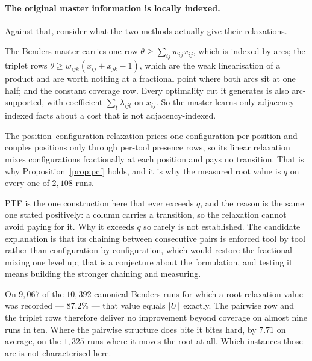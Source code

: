 \paragraph{The original master information is locally indexed.}
Against that, consider what the two methods actually give their relaxations.

The Benders master carries one row $\theta\ge\sum_{ij}w_{ij}x_{ij}$, which is indexed
by arcs; the triplet rows $\theta\ge w_{ijk}(x_{ij}+x_{jk}-1)$, which are the weak
linearisation of a product and are worth nothing at a fractional point where both arcs
sit at one half; and the constant coverage row. Every optimality cut it generates is
also arc-supported, with coefficient $\sum_t\lambda_{ijt}$ on $x_{ij}$. So the master
learns only adjacency-indexed facts about a cost that is not adjacency-indexed.

The position--configuration relaxation prices one configuration per position and
couples positions only through per-tool presence rows, so its linear relaxation mixes
configurations fractionally at each position and pays no transition. That is why
Proposition~\ref{prop:pcf} holds, and it is why the measured root value is $q$ on every
one of $2{,}108$ runs.

PTF is the one construction here that ever exceeds $q$, and the reason is the same one
stated positively: a column carries a transition, so the relaxation cannot avoid paying
for it. Why it exceeds $q$ so rarely is not established. The candidate explanation is
that its chaining between consecutive pairs is enforced tool by tool rather than
configuration by configuration, which would restore the fractional mixing one level up;
that is a conjecture about the formulation, and testing it means building the stronger
chaining and measuring.

\begin{observation}\label{obs:rootq}
On $9{,}067$ of the $10{,}392$ canonical Benders runs for which a root relaxation value was
recorded --- $87.2\%$ --- that value equals $\lvert U\rvert$ exactly. The pairwise row
and the triplet rows therefore deliver no improvement beyond coverage on almost nine
runs in ten. Where
the pairwise structure does bite it bites hard, by $7.71$ on average, on the $1{,}325$
runs where it moves the root at all. Which instances those are is not characterised
here.
\end{observation}

